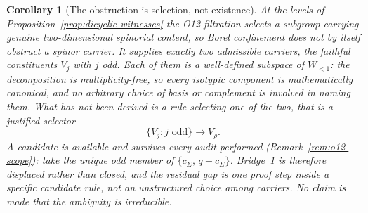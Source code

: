 \documentclass[11pt,a4paper]{article}
\newtheorem{corollary}[theorem]{Corollary}
\begin{document}
    \begin{corollary}[The obstruction is selection, not existence]
      \label{cor:selection-not-existence}
      At the levels of Proposition~\ref{prop:dicyclic-witnesses} the O12 filtration selects a
      subgroup carrying genuine two-dimensional spinorial content, so Borel confinement does not
      by itself obstruct a spinor carrier.
      It supplies exactly two admissible carriers, the faithful constituents $V_{j}$ with $j$
      odd.
      Each of them is a well-defined subspace of $W_{<1}$: the decomposition is
      multiplicity-free, so every isotypic component is mathematically canonical, and no
      arbitrary choice of basis or complement is involved in naming them.
      What has \emph{not} been \emph{derived} is a rule selecting one of the two, that is a
      justified selector
      \[
        \{V_{j} : j \text{ odd}\} \longrightarrow V_{\rho}.
      \]
      A candidate is available and survives every audit performed
      (Remark~\ref{rem:o12-scope}): take the unique odd member of
      $\{c_{\Sigma},\, q - c_{\Sigma}\}$.
      Bridge~1 is therefore displaced rather than closed, and the residual gap is one proof step
      inside a specific candidate rule, not an unstructured choice among carriers.
      No claim is made that the ambiguity is irreducible.
    \end{corollary}
\end{document}
